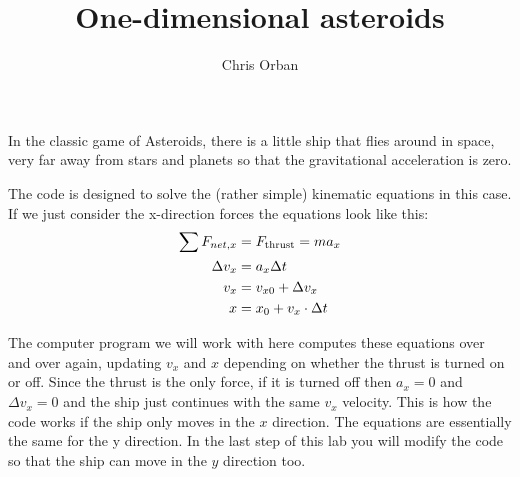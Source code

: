 \documentclass{ximera}
\author{Chris Orban}
\title{One-dimensional asteroids}
\begin{document}
\maketitle

In the classic game of Asteroids, there is a little ship that flies
around in space, very far away from stars and planets so that the
gravitational acceleration is zero.

The code is designed to solve the (rather simple) kinematic equations
in this case. If we just consider the x-direction forces the equations
look like this:
\begin{align*}
\sum F_{net,x} &= F_{\rm thrust} = ma_x \\
\Delta v_x &= a_x \Delta t \\
v_x &= v_{x0} + \Delta v_x \\
x &= x_0 + v_x \cdot \Delta t
\end{align*}

The computer program we will work with here computes these equations
over and over again, updating $v_x$ and $x$ depending on whether the
thrust is turned on or off. Since the thrust is the only force, if it
is turned off then $a_x = 0$ and $\Delta v_x = 0$ and the ship just
continues with the same $v_x$ velocity. This is how the code works if
the ship only moves in the $x$ direction. The equations are essentially
the same for the y direction. In the last step of this lab you will
modify the code so that the ship can move in the $y$ direction too.
\end{document}
